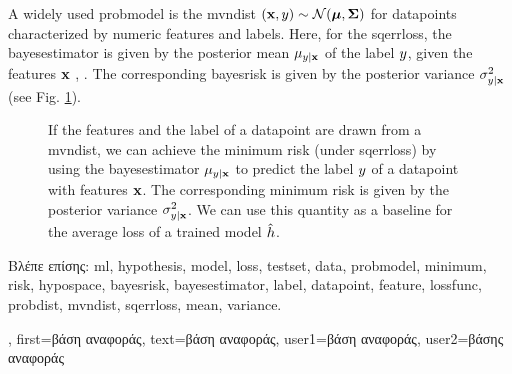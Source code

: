 {{\begin{enumerate}[label=\arabic*)]
   \end{enumerate}
A widely used \gls{probmodel} is the \gls{mvndist} $\left( {\bf x},y \right) \sim \mathcal{N}({\bm \mu},{\bm \Sigma})$ 
for \gls{datapoint}s characterized by numeric \gls{feature}s and \gls{label}s.
Here, for the \gls{sqerrloss}, the \gls{bayesestimator} is given by the posterior 
\gls{mean} $\mu_{y|{\bf x}}$ of the \gls{label} $y$, given the 
\gls{feature}s ${\bf x}$ \cite{LC}, \cite{GrayProbBook}. The corresponding \gls{bayesrisk} 
is given by the posterior \gls{variance} 
$\sigma^{2}_{y|{\bf x}}$ (see Fig. \ref{fig_post_baseline_dict}).
	\begin{figure}[H]
		\begin{center}
		\end{center}
		\caption{If the \gls{feature}s and the \gls{label} of a \gls{datapoint} are drawn from a \gls{mvndist}, we 
		can achieve the \gls{minimum} \gls{risk} (under \gls{sqerrloss}) by using the \gls{bayesestimator} $\mu_{y|{\bf x}}$ 
		to predict the \gls{label} $y$ of a \gls{datapoint} with \gls{feature}s ${\bf x}$. The corresponding 
		\gls{minimum} \gls{risk} is given by the posterior \gls{variance} $\sigma^{2}_{y|{\bf x}}$. We can use 
		this quantity as a baseline for the average \gls{loss} of a trained \gls{model} $\hat{h}$. \label{fig_post_baseline_dict}}
	\end{figure}
	\foreignlanguage{greek}{Βλέπε επίσης:} \gls{ml}, \gls{hypothesis}, \gls{model}, \gls{loss}, \gls{testset}, \gls{data}, \gls{probmodel}, \gls{minimum}, \gls{risk}, \gls{hypospace}, \gls{bayesrisk}, \gls{bayesestimator}, \gls{label}, \gls{datapoint}, \gls{feature}, \gls{lossfunc}, \gls{probdist}, \gls{mvndist}, \gls{sqerrloss}, \gls{mean}, \gls{variance}.},
    first={\foreignlanguage{greek}{βάση αναφοράς}},
    text={\foreignlanguage{greek}{βάση αναφοράς}},
    user1={\foreignlanguage{greek}{βάση αναφοράς}}, %
    user2={\foreignlanguage{greek}{βάσης αναφοράς}} %
}

